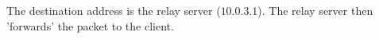 The destination address is the relay server ($10.0.3.1$). The relay server then 'forwards' the packet to the client.
